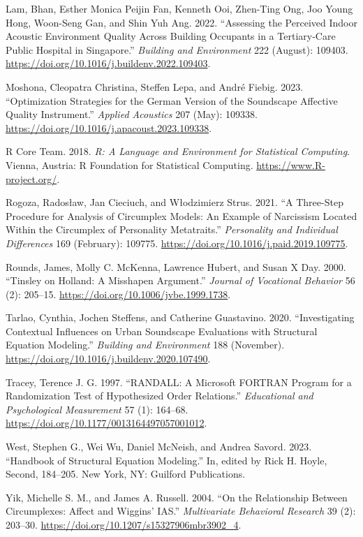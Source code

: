 \documentclass[
  default,
]{sn-jnl}
\newlength{\cslhangindent}
\newenvironment{CSLReferences}[2] %
 {\begin{list}{}{%
  \setlength{\itemindent}{0pt}
  \setlength{\leftmargin}{0pt}
  \setlength{\parsep}{0pt}
  \ifodd #1
   \setlength{\leftmargin}{\cslhangindent}
   \setlength{\itemindent}{-1\cslhangindent}
  \fi
  \setlength{\itemsep}{#2\baselineskip}}}
 {\end{list}}
\begin{document}
\begin{CSLReferences}{1}{0}
Lam, Bhan, Esther Monica Peijin Fan, Kenneth Ooi, Zhen-Ting Ong, Joo
Young Hong, Woon-Seng Gan, and Shin Yuh Ang. 2022. {``Assessing the
Perceived Indoor Acoustic Environment Quality Across Building Occupants
in a Tertiary-Care Public Hospital in Singapore.''} \emph{Building and
Environment} 222 (August): 109403.
\url{https://doi.org/10.1016/j.buildenv.2022.109403}.

Moshona, Cleopatra Christina, Steffen Lepa, and André Fiebig. 2023.
{``Optimization Strategies for the German Version of the Soundscape
Affective Quality Instrument.''} \emph{Applied Acoustics} 207 (May):
109338. \url{https://doi.org/10.1016/j.apacoust.2023.109338}.

R Core Team. 2018. \emph{{R}: {A} {L}anguage and {E}nvironment for
{S}tatistical {C}omputing}. Vienna, Austria: R Foundation for
Statistical Computing. \url{https://www.R-project.org/}.

Rogoza, Radosław, Jan Cieciuch, and Włodzimierz Strus. 2021. {``A
Three-Step Procedure for Analysis of Circumplex Models: An Example of
Narcissism Located Within the Circumplex of Personality Metatraits.''}
\emph{Personality and Individual Differences} 169 (February): 109775.
\url{https://doi.org/10.1016/j.paid.2019.109775}.

Rounds, James, Molly C. McKenna, Lawrence Hubert, and Susan X Day. 2000.
{``Tinsley on Holland: A Misshapen Argument.''} \emph{Journal of
Vocational Behavior} 56 (2): 205--15.
\url{https://doi.org/10.1006/jvbe.1999.1738}.

Tarlao, Cynthia, Jochen Steffens, and Catherine Guastavino. 2020.
{``Investigating Contextual Influences on Urban Soundscape Evaluations
with Structural Equation Modeling.''} \emph{Building and Environment}
188 (November). \url{https://doi.org/10.1016/j.buildenv.2020.107490}.

Tracey, Terence J. G. 1997. {``RANDALL: A Microsoft FORTRAN Program for
a Randomization Test of Hypothesized Order Relations.''}
\emph{Educational and Psychological Measurement} 57 (1): 164--68.
\url{https://doi.org/10.1177/0013164497057001012}.

West, Stephen G., Wei Wu, Daniel McNeish, and Andrea Savord. 2023.
{``Handbook of {S}tructural {E}quation {M}odeling.''} In, edited by Rick
H. Hoyle, Second, 184--205. New York, NY: Guilford Publications.

Yik, Michelle S. M., and James A. Russell. 2004. {``On the Relationship
Between Circumplexes: Affect and Wiggins' IAS.''} \emph{Multivariate
Behavioral Research} 39 (2): 203--30.
\url{https://doi.org/10.1207/s15327906mbr3902_4}.

\end{CSLReferences}
\end{document}
